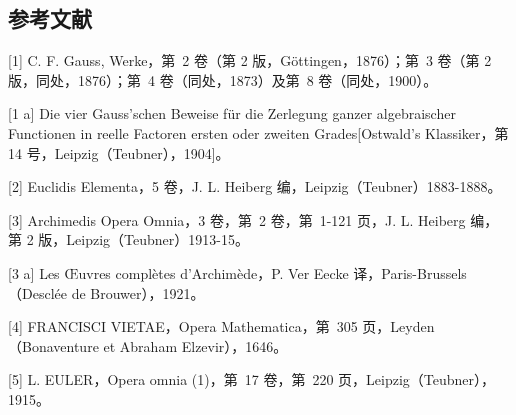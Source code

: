 \subsection*{参考文献}

{[}1{]} C. F. Gauss, Werke，第~2 卷（第 2 版，Göttingen，1876）；第~3 卷（第 2 版，同处，1876）；第~4 卷（同处，1873）及第~8 卷（同处，1900）。

{[}1 a{]} Die vier Gauss'schen Beweise für die Zerlegung ganzer algebraischer Functionen in reelle Factoren ersten oder zweiten Grades{[}Ostwald's Klassiker，第 14 号，Leipzig（Teubner），1904{]}。

{[}2{]} Euclidis Elementa，5 卷，J. L. Heiberg 编，Leipzig（Teubner）1883-1888。

{[}3{]} Archimedis Opera Omnia，3 卷，第~2 卷，第~1-121 页，J. L. Heiberg 编，第 2 版，Leipzig（Teubner）1913-15。

{[}3 a{]} Les Œuvres complètes d'Archimède，P. Ver Eecke 译，Paris-Brussels（Desclée de Brouwer），1921。

{[}4{]} FRANCISCI VIETAE，Opera Mathematica，第~305 页，Leyden（Bonaventure et Abraham Elzevir），1646。

{[}5{]} L. EULER，Opera omnia (1)，第~17 卷，第~220 页，Leipzig（Teubner），1915。


